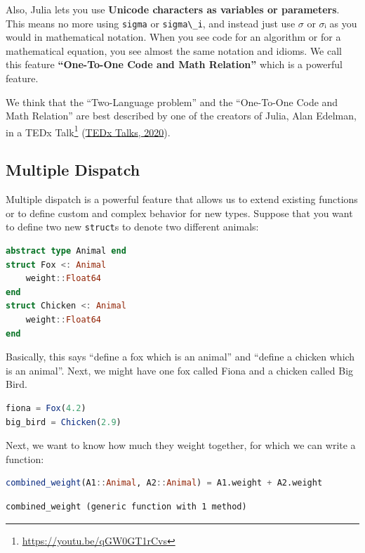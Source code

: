 \documentclass[
  notoc %
]{tufte-book}
\DeclareRobustCommand{\href}[2]{#2\footnote{\url{#1}}}
\newcommand{\passthrough}[1]{#1}
\begin{document}
Also, Julia lets you use \textbf{Unicode characters as variables or
parameters}. This means no more using \passthrough{\lstinline!sigma!} or
\passthrough{\lstinline!sigma\_i!}, and instead just use \(σ\) or \(σᵢ\)
as you would in mathematical notation. When you see code for an
algorithm or for a mathematical equation, you see almost the same
notation and idioms. We call this feature \textbf{``One-To-One Code and
Math Relation''} which is a powerful feature.

We think that the ``Two-Language problem'' and the ``One-To-One Code and
Math Relation'' are best described by one of the creators of Julia, Alan
Edelman, in a \href{https://youtu.be/qGW0GT1rCvs}{TEDx Talk}
(\protect\hyperlink{ref-tedxtalksProgrammingLanguageHeal2020}{TEDx
Talks, 2020}).

\hypertarget{sec:multiple_dispatch}{%
\subsection{Multiple Dispatch}\label{sec:multiple_dispatch}}

Multiple dispatch is a powerful feature that allows us to extend
existing functions or to define custom and complex behavior for new
types. Suppose that you want to define two new
\passthrough{\lstinline!struct!}s to denote two different animals:

\begin{lstlisting}[language=Julia]
abstract type Animal end
struct Fox <: Animal
    weight::Float64
end
struct Chicken <: Animal
    weight::Float64
end
\end{lstlisting}

Basically, this says ``define a fox which is an animal'' and ``define a
chicken which is an animal''. Next, we might have one fox called Fiona
and a chicken called Big Bird.

\begin{lstlisting}[language=Julia]
fiona = Fox(4.2)
big_bird = Chicken(2.9)
\end{lstlisting}

Next, we want to know how much they weight together, for which we can
write a function:

\begin{lstlisting}[language=Julia]
combined_weight(A1::Animal, A2::Animal) = A1.weight + A2.weight
\end{lstlisting}

\begin{lstlisting}[language=Output]
combined_weight (generic function with 1 method)
\end{lstlisting}
\end{document}
